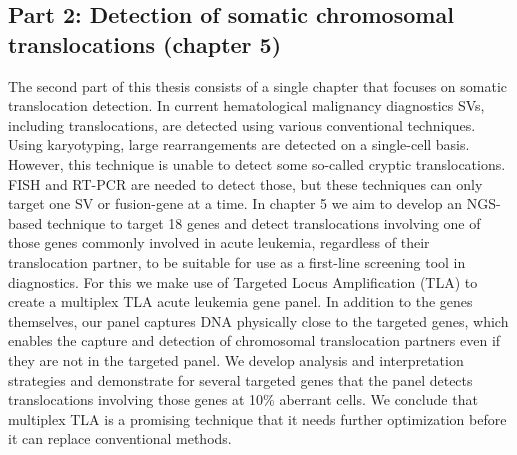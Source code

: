 \subsection[Detection of somatic chromosomal translocations]{Part 2: Detection of somatic chromosomal \newline translocations (chapter 5)}\label{Part2}
The second part of this thesis consists of a single chapter that focuses on somatic translocation detection. 
In current hematological malignancy diagnostics SVs, including translocations, are detected using various conventional techniques. 
Using karyotyping, large rearrangements are detected on a single-cell basis. 
However, this technique is unable to detect some so-called cryptic translocations. 
FISH and RT-PCR are needed to detect those, but these techniques can only target one SV or fusion-gene at a time. 
In chapter 5 we aim to develop an NGS-based technique to target 18 genes and detect translocations involving one of those genes commonly involved in acute leukemia, regardless of their translocation partner, to be suitable for use as a first-line screening tool in diagnostics. 
For this we make use of Targeted Locus Amplification (TLA) \cite{de_Vree_2014} to create a multiplex TLA acute leukemia gene panel. In addition to the genes themselves, our panel captures DNA physically close to the targeted genes, which enables the capture and detection of chromosomal translocation partners even if they are not in the targeted panel. 
We develop analysis and interpretation strategies and demonstrate for several targeted genes that the panel detects translocations involving those genes at 10\% aberrant cells. 
We conclude that multiplex TLA is a promising technique that it needs further optimization before it can replace conventional methods.


